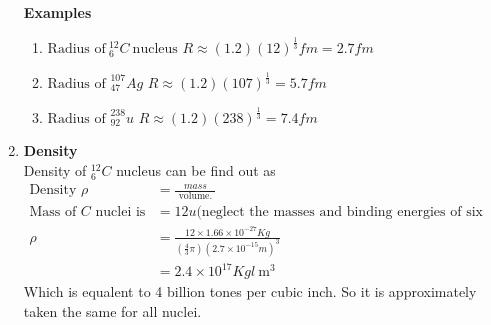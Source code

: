 \begin{enumerate}
\textbf{Examples}
\begin{enumerate}
	\item $ \text{Radius of}\ ^{12}_6 C\  \text{nucleus}$
$R\approx(1.2)(12)^\frac{1}{3}fm=2.7fm$
\item $ \text{Radius of }^{107}_{47}Ag$
$R\approx(1.2)(107)^\frac{1}{3}=5.7fm$
 \item $ \text{Radius of }^{238}_{92}u$
$R\approx(1.2)(238)^\frac{1}{3}=7.4fm$
\end{enumerate}
\item \textbf{Density}\\
Density of $^{12}_6C$ nucleus can be find out as
\begin{align*}
\text{Density } \rho &=\frac{mass}{\text { volume. }}\\
\text{Mass of $C$ nuclei is }&=12 u\text{(neglect the masses and binding energies of six electrons)}\\
\rho&=\frac{12\times1.66\times10^{-27}Kg}{\left(\frac{4}{3}\pi \right)\left(2.7\times 10^{-15} m \right)^3  }\\
&=2.4 \times 10^{17} Kg l \mathrm{~m}^{3}
\end{align*}
Which is equalent to 4 billion tones per cubic inch. So it is approximately taken the same for all nuclei.
\begin{center}
	\framebox{
		\parbox[t][0.5cm]{3.5cm}{
			
			\addvspace{-0.5cm} \centering
			
}}
\end{center}
\end{enumerate}
